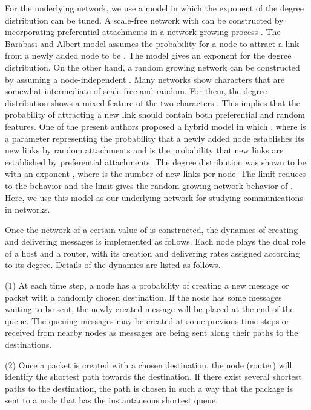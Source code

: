 \documentclass[aps,prl,twocolumn,superscriptaddress,showpacs]{revtex4}
\begin{document}
For the underlying network, we use a model in which the exponent
of the degree distribution can be tuned.  A scale-free network
with  can be constructed by incorporating
preferential attachments in a network-growing process
\cite{BA:1999,LL:2002}.  The Barabasi and Albert model
\cite{BA:1999} assumes the probability  for a node  to
attract a link from a newly added node to be . The
model gives an exponent  \cite{BA:1999} for the degree
distribution.  On the other hand, a random growing network can be
constructed by assuming a node-independent . Many
networks show characters that are somewhat intermediate of
scale-free and random.  For them, the degree distribution shows a
mixed feature of the two characters \cite{Newm:2001}.  This
implies that the probability  of attracting a new link
should contain both preferential and random features.  One of the
present authors proposed a hybrid model \cite{LLYD:2002} in which
, where  is a parameter
representing the probability that a newly added node establishes
its new links by random attachments and  is the probability
that new links are established by preferential attachments.  The
degree distribution was shown to be \cite{LLYD:2002}  with an exponent , where  is the number of new links per node.  The
 limit reduces to the  behavior and the  limit gives the random growing network behavior of
.  Here, we use this model as our underlying
network for studying communications in networks.

Once the network of a certain value of  is constructed, the
dynamics of creating and delivering messages is implemented as
follows.  Each node plays the dual role of a host and a router,
with its creation and delivering rates assigned according to its
degree.  Details of the dynamics are listed as follows.

\noindent (1) At each time step, a node  has a probability
 of creating a new message or packet with a randomly
chosen destination. If the node has some messages waiting to be
sent, the newly created message will be placed at the end of the
queue.  The queuing messages may be created at some previous time
steps or received from nearby nodes as messages are being sent
along their paths to the destinations.

\noindent (2) Once a packet is created with a chosen destination,
the node (router) will identify the shortest path towards the
destination. If there exist several shortest paths to the
destination, the path is chosen in such a way that the package is
sent to a node that has the instantaneous shortest queue.
\end{document}
